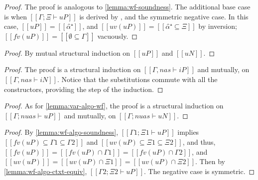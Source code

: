 \lemmaWfAlgoSoundness*
\begin{proof}
  The proof is analogous to \cref{lemma:wf-soundness}.
  The additional base case is when $[[Γ ; Ξ ⊢ uP]]$ is derived by ,
  and the symmetric negative case.
  In this case, $[[uP]] = [[α̂⁺]]$, and $[[uv(uP)]] = [[{α̂⁺} ⊆ Ξ]]$ by inversion; $[[fv(uP)]] = [[∅ ⊆ Γ]]$ vacuously.
\end{proof}

\lemmaWfAlgoCtxtEquiv*
\begin{proof}
  By mutual structural induction on $[[uP]]$ and $[[uN]]$.
\end{proof}

\lemmaVarAlgoWf*
\begin{proof}
  The proof is a structural induction on $[[Γ, nas ⊢ iP]]$ and mutually, on $[[Γ, nas ⊢ iN]]$.
  Notice that the substitutions commute with all the constructors,
  providing the step of the induction. 
\end{proof}

\lemmaVarDealgoWf*
\begin{proof}
  As for \cref{lemma:var-algo-wf}, the proof is a structural induction on 
  $[[Γ; {nuas} ⊢ uP]]$ and mutually, on $[[Γ; {nuas} ⊢ uN]]$.
\end{proof}

\corollaryWfWeakeningAlgo*
\begin{proof}
  By \cref{lemma:wf-algo-soundness},
  $[[Γ1; Ξ1 ⊢ uP]]$ implies $[[fv(uP) ⊆ Γ1 ⊆ Γ2]]$
  and $[[uv(uP) ⊆ Ξ1 ⊆ Ξ2]]$,
  and thus, $[[fv(uP)]] = [[fv(uP) ∩ Γ1]] = [[fv(uP) ∩ Γ2]]$, 
  and $[[uv(uP)]] = [[uv(uP) ∩ Ξ1]] = [[uv(uP) ∩ Ξ2]]$.
  Then by \cref{lemma:wf-algo-ctxt-equiv}, $[[Γ2; Ξ2 ⊢ uP]]$. 
  The negative case is symmetric.
\end{proof}